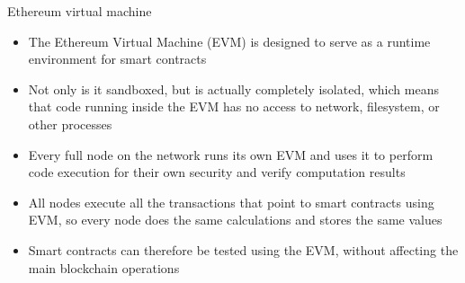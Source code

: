 \documentclass[9pt]{beamer}
\begin{document}

\begin{frame}{Ethereum virtual machine}
	\begin{itemize}
		\item The Ethereum Virtual Machine (EVM) is designed to serve as a runtime environment for smart contracts
		\item Not only is it sandboxed, but is actually completely isolated, which means that code running inside the EVM has no access to network, filesystem, or other processes
		\item Every full node on the network runs its own EVM and uses it to perform code execution for their own security and verify computation results
		\item All nodes execute all the transactions that point to smart contracts using EVM, so every node does the same calculations and stores the same values
		\item Smart contracts can therefore be tested using the EVM, without affecting the main blockchain operations
	\end{itemize}
\end{frame}




\end{document}
